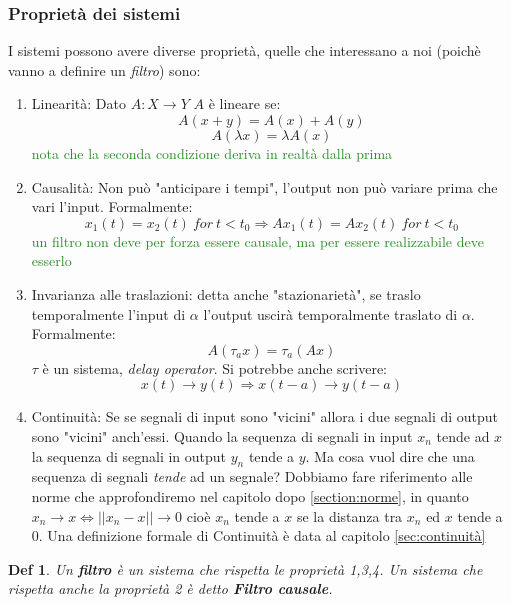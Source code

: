 \documentclass[a4paper]{article}
\newtheorem*{definition}{Def}
\newcommand{\appunto}[1]{\textcolor{ForestGreen}{#1}}
\begin{document}
\subsubsection{Proprietà dei sistemi}
I sistemi possono avere diverse proprietà, quelle che interessano a noi (poichè vanno a definire un \textit{filtro}) sono:
\begin{enumerate}
	\item Linearità: Dato $A: X \rightarrow Y$ $A$ è lineare se:
		$$A(x + y) = A(x) + A(y)$$
		$$A(\lambda x) = \lambda A(x)$$
	\appunto{nota che la seconda condizione deriva in realtà dalla prima}
	\item Causalità: Non può "anticipare i tempi", l'output non può variare prima che vari l'input.
		Formalmente: 
		$$ x_1(t) = x_2(t)\: for \: t<t_0 \Rightarrow Ax_1(t) = Ax_2(t)\: for \: t<t_0 $$
		\appunto{un filtro non deve per forza essere causale, ma per essere realizzabile deve esserlo}
	\item Invarianza alle traslazioni: detta anche "stazionarietà", se traslo temporalmente l'input di $\alpha$ l'output uscirà temporalmente traslato di $\alpha$. 
		Formalmente:
		$$ A(\tau_a x) = \tau_a (Ax)$$
		$\tau$ è un sistema, \textit{delay operator}. Si potrebbe anche scrivere:
		$$ x(t) \rightarrow y(t) \Rightarrow x(t-a) \rightarrow y(t-a)$$
	\item Continuità: Se se segnali di input sono "vicini" allora i due segnali di output sono "vicini" anch'essi. 
		Quando la sequenza di segnali in input $x_n$ tende ad $x$ la sequenza di segnali in output $y_n$ tende a $y$.
		Ma cosa vuol dire che una sequenza di segnali \textit{tende} ad un segnale? 
		Dobbiamo fare riferimento alle norme che approfondiremo nel capitolo dopo \ref{section:norme}, in quanto $x_n \rightarrow x \iff ||x_n - x|| \rightarrow 0$ cioè $x_n$ tende a $x$ se la distanza tra $x_n$ ed $x$ tende a 0. 
		Una definizione formale di Continuità è data al capitolo \ref{sec:continuità}
\end{enumerate}
\begin{definition}
	Un \textbf{filtro} è un sistema che rispetta le proprietà 1,3,4. Un sistema che rispetta anche la proprietà 2 è detto \textbf{Filtro causale}.
\end{definition}
\end{document}
